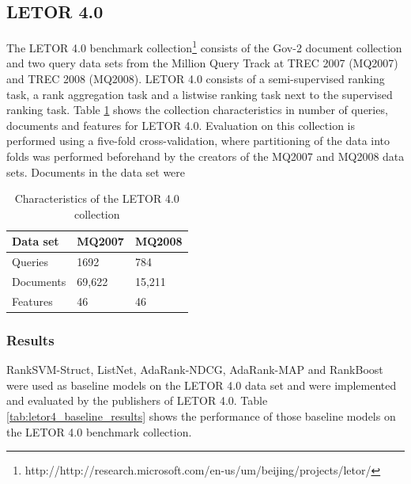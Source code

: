 \subsection{LETOR 4.0}
The LETOR 4.0 benchmark collection\footnote{http://http://research.microsoft.com/en-us/um/beijing/projects/letor/} consists of the Gov-2 document collection and two query data sets from the Million Query Track at \ac{TREC} 2007 (MQ2007) and \ac{TREC} 2008 (MQ2008). LETOR 4.0 consists of a semi-supervised ranking task, a rank aggregation task and a listwise ranking task next to the supervised ranking task. Table \ref{tab:letor4_characteristics} shows the collection characteristics in number of queries, documents and features for LETOR 4.0. Evaluation on this collection is performed using a five-fold cross-validation, where partitioning of the data into folds was performed beforehand by the creators of the MQ2007 and MQ2008 data sets. Documents in the data set were 

\begin{table}
\begin{tabular}{l|ll}
 Data set & MQ2007 & MQ2008 \\ 
 \hline
 Queries & 1692 & 784 \\ 
 Documents & 69,622 & 15,211 \\
 Features & 46 & 46 \\
\end{tabular}
\caption{Characteristics of the LETOR 4.0 collection}
\label{tab:letor4_characteristics}
\end{table}
\subsubsection{Results}
Rank\ac{SVM}-Struct, ListNet, AdaRank-\ac{NDCG}, AdaRank-\ac{MAP} and RankBoost were used as baseline models on the LETOR 4.0 data set and were implemented and evaluated by the publishers of LETOR 4.0. Table \ref{tab:letor4_baseline_results} shows the performance of those baseline models on the LETOR 4.0 benchmark collection.\\

